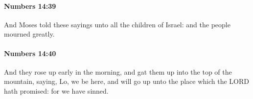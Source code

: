 		\paragraph{Numbers 14:39} %
			\label{NUMBERS-14-39}

			And Moses told these sayings unto all the children of Israel: and the people mourned greatly.


		\paragraph{Numbers 14:40} %
			\label{NUMBERS-14-40}

			And they rose up early in the morning, and gat them up into the top of the mountain, saying, Lo, we be here, and will go up unto the place which the LORD hath promised: for we have sinned.


